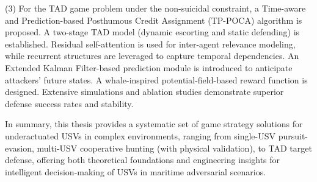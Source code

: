 \begin{eabstract}
(3) For the TAD game problem under the non-suicidal constraint, a Time-aware and
Prediction-based Posthumous Credit Assignment (TP-POCA) algorithm is proposed. A
two-stage TAD model (dynamic escorting and static defending) is established.
Residual self-attention is used for inter-agent relevance modeling, while recurrent
structures are leveraged to capture temporal dependencies. An Extended Kalman
Filter-based prediction module is introduced to anticipate attackers' future
states. A whale-inspired potential-field-based reward function is designed.
Extensive simulations and ablation studies demonstrate superior defense success
rates and stability.

In summary, this thesis provides a systematic set of game strategy solutions for
underactuated USVs in complex environments, ranging from single-USV
pursuit-evasion, multi-USV cooperative hunting (with physical validation), to TAD
target defense, offering both theoretical foundations and engineering insights for
intelligent decision-making of USVs in maritime adversarial scenarios.
\end{eabstract}

